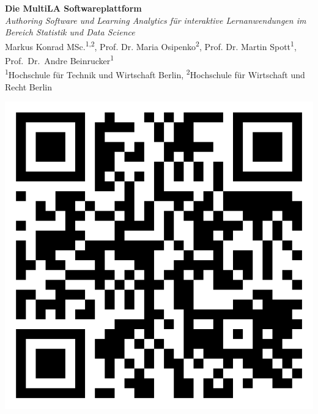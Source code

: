 \documentclass[a0,portrait]{a0poster}
\begin{document}


\begin{minipage}[b]{0.75\linewidth}
\veryHuge \color{NavyBlue} \textbf{Die MultiLA Softwareplattform} \color{Black}\\ %
\Huge\textit{Authoring Software und Learning Analytics für interaktive \mbox{Lernanwendungen} im Bereich Statistik und Data Science}\\[2cm] %
\huge Markus Konrad MSc.\textsuperscript{1,2},
Prof. Dr. Maria Osipenko\textsuperscript{2},
Prof. Dr. Martin Spott\textsuperscript{1},
Prof.~Dr.~Andre Beinrucker\textsuperscript{1}\\[0.5cm] %
\large \textsuperscript{1}Hochschule für Technik und Wirtschaft Berlin, \textsuperscript{2}Hochschule für Wirtschaft und Recht Berlin\\[0.4cm] %
\end{minipage}
%
\begin{minipage}[b]{0.25\linewidth}
\includegraphics[width=15cm,right]{qrcode.png}
\end{minipage}
\end{document}
